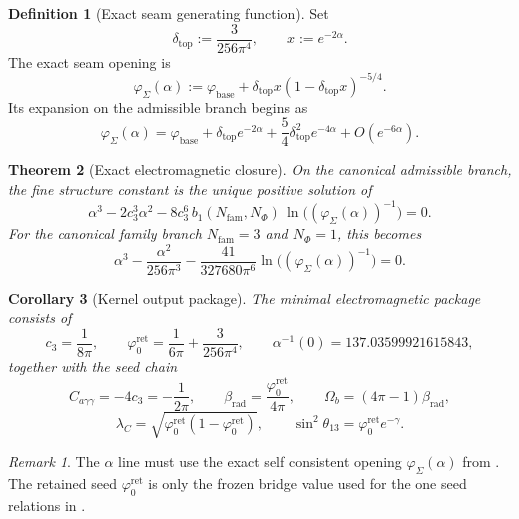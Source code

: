 \documentclass[11pt,a4paper]{article}
\newtheorem{theorem}{Theorem}[section]
\newtheorem{corollary}[theorem]{Corollary}
\theoremstyle{definition}
\newtheorem{definition}[theorem]{Definition}
\theoremstyle{remark}
\newtheorem*{remark}{Remark}
\newcommand{\cthree}{c_3}
\newcommand{\bone}{b_1}
\newcommand{\phibase}{\varphi_{\mathrm{base}}}
\newcommand{\phiseam}{\varphi_{\Sigma}}
\newcommand{\phiz}{\varphi_{0}^{\mathrm{ret}}}
\newcommand{\deltatop}{\delta_{\mathrm{top}}}
\newcommand{\gammaY}{\gamma}
\numberwithin{equation}{section}
\begin{document}
\begin{definition}[Exact seam generating function]
\label{def:seam-generating-function}
Set
\[
\deltatop := \frac{3}{256\pi^4},
\qquad
x := e^{-2\alpha}.
\]
The exact seam opening is
\begin{equation}
\label{eq:phi-seam}
\phiseam(\alpha)
:=
\phibase + \deltatop x(1-\deltatop x)^{-5/4}.
\end{equation}
Its expansion on the admissible branch begins as
\[
\phiseam(\alpha)
=
\phibase
+\deltatop e^{-2\alpha}
+\frac54 \deltatop^2 e^{-4\alpha}
+O(e^{-6\alpha}).
\]
\end{definition}

\begin{theorem}[Exact electromagnetic closure]
\label{thm:electromagnetic-closure}
On the canonical admissible branch, the fine structure constant is the unique positive solution of
\begin{equation}
\label{eq:carrier-cfe}
\alpha^3 - 2\cthree^3\alpha^2 - 8\cthree^6\,\bone(N_{\mathrm{fam}},N_\Phi)\,
\ln\!\bigl((\phiseam(\alpha))^{-1}\bigr) = 0.
\end{equation}
For the canonical family branch $N_{\mathrm{fam}}=3$ and $N_\Phi=1$, this becomes
\begin{equation}
\label{eq:carrier-cfe-canonical}
\alpha^3 - \frac{\alpha^2}{256\pi^3}
-
\frac{41}{327680\pi^6}\ln\!\bigl((\phiseam(\alpha))^{-1}\bigr)
= 0.
\end{equation}
\end{theorem}

\begin{corollary}[Kernel output package]
\label{cor:kernel-package}
The minimal electromagnetic package consists of
\[
\cthree = \frac{1}{8\pi},
\qquad
\phiz = \frac{1}{6\pi}+\frac{3}{256\pi^4},
\qquad
\alpha^{-1}(0)=137.03599921615843,
\]
together with the seed chain
\[
C_{a\gamma\gamma} = -4\cthree = -\frac{1}{2\pi},
\qquad
\beta_{\mathrm{rad}} = \frac{\phiz}{4\pi},
\qquad
\Omega_b = (4\pi-1)\beta_{\mathrm{rad}},
\]
\[
\lambda_C = \sqrt{\phiz(1-\phiz)},
\qquad
\sin^2\theta_{13} = \phiz e^{-\gammaY}.
\]
\end{corollary}

\begin{remark}
The $\alpha$ line must use the exact self consistent opening $\phiseam(\alpha)$ from
. The retained seed $\phiz$ is only the frozen bridge value used for the
one seed relations in .
\end{remark}
\end{document}
